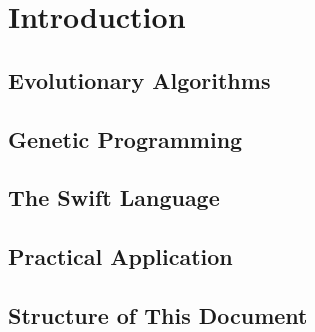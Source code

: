 \chapter{Introduction}

\section{Evolutionary Algorithms}
\todo

\section{Genetic Programming}
\todo

\section{The Swift Language}
\todo

\section{Practical Application}
\todo

\section{Structure of This Document}
\todo
